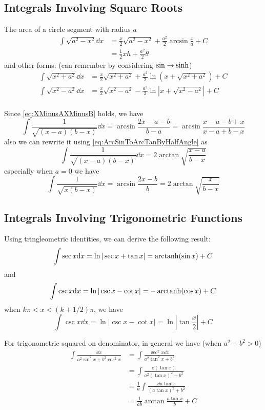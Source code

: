 \documentclass{overview}
\begin{document}
\subsection{Integrals Involving Square Roots}
The area of a circle segment with radius $a$ 
\[
	\begin{aligned}
	\int \sqrt{a^2 - x^2} \dd x 
	&= \frac{x}{2} \sqrt{a^2 - x^2}
	+ \frac{a^2}{2} \arcsin \frac{x}{a} + C \\
	&=\frac{1}{2} xh + \frac{a^2}{2}\theta
	\end{aligned}
\] 
and other forms: (can remember by considering $\sin \to \sinh$)
\[
\begin{aligned}
	\int \sqrt{x^2 + a^2} \dd x &= \frac{x}{2} \sqrt{x^2 + a^2}
	+ \frac{a^2}{2} \ln( x + \sqrt{x^2 + a^2}) + C \\
	\int \sqrt{x^2 - a^2} \dd x &= \frac{x}{2} \sqrt{x^2 - a^2}
	- \frac{a^2}{2} \ln \left| x + \sqrt{x^2 - a^2} \right| + C \\
\end{aligned}
\] 

Since \eqref{eq:XMinusAXMinusB} holds, we have
\[
	\int \frac{1}{\sqrt{(x-a)(b-x)}} \dd x = \arcsin \frac{2x - a - b}{b - a}
	= \arcsin \frac{x-a-b+x}{x-a+b-x}
\]
also we can rewrite it using \eqref{eq:ArcSinToArcTanByHalfAngle} as
\[
	\int \frac{1}{\sqrt{(x-a)(b-x)}} \dd x = 2 \arctan \sqrt{\frac{x-a}{b-x}}
\]
especially when $a=0$ we have
\[
	\int \frac{1}{\sqrt{x(b-x)}} \dd x = \arcsin \frac{2x-b}{b} = 2 \arctan \sqrt{\frac{x}{b-x}}
\]

\subsection{Integrals Involving Trigonometric Functions}

Using tringleometric identities, we can derive the following result:
\[
	\int \sec x \mathrm{d} x = \ln|\sec x + \tan x| = \operatorname{arctanh}(\sin x) + C
\] 
and
\[
\int \csc x \mathrm{d} x = \ln|\csc x - \cot x| = -\operatorname{arctanh}(\cos x) + C
\] 
when $k\pi < x < (k+1 / 2)\pi$, we have
\[
	\int \csc x \dd x = \ln|\csc x - \cot x| = \ln \left|\tan \frac{x}{2}\right| + C
\] 

For trigonometric squared on denominator, in general we have (when $a ^2+ b^2 > 0$)
\[
	\begin{aligned}
	\int \frac{\dd x}{a^2 \sin^2 x + b^2 \cos^2 x}
	&= \int \frac{\sec^2 x \dd x}{a^2 \tan^2 x + b^2} \\
	&= \int \frac{\dd (\tan x)}{a^2 (\tan x)^2 + b^2} \\
	&= \frac{1}{a} \int \frac{\dd a \tan x}{(a \tan x)^2 + b^2} \\
	&= \frac{1}{a b} \arctan \frac{a \tan x}{b} + C
		\end{aligned}
\] 
\end{document}
